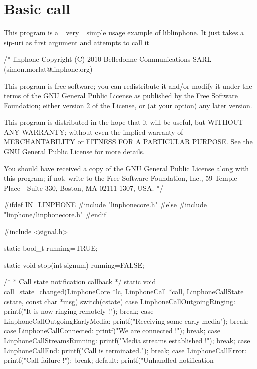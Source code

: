 \section{\-Basic call}
\label{group__basic__call__tutorials}
\-This program is a \-\_\-very\-\_\- simple usage example of liblinphone. \-It just takes a sip-\/uri as first argument and attempts to call it


\begin{DoxyCodeInclude}

/*
linphone
Copyright (C) 2010  Belledonne Communications SARL 
 (simon.morlat@linphone.org)

This program is free software; you can redistribute it and/or
modify it under the terms of the GNU General Public License
as published by the Free Software Foundation; either version 2
of the License, or (at your option) any later version.

This program is distributed in the hope that it will be useful,
but WITHOUT ANY WARRANTY; without even the implied warranty of
MERCHANTABILITY or FITNESS FOR A PARTICULAR PURPOSE.  See the
GNU General Public License for more details.

You should have received a copy of the GNU General Public License
along with this program; if not, write to the Free Software
Foundation, Inc., 59 Temple Place - Suite 330, Boston, MA  02111-1307, USA.
*/

#ifdef IN_LINPHONE
#include "linphonecore.h"
#else
#include "linphone/linphonecore.h"
#endif

#include <signal.h>

static bool_t running=TRUE;

static void stop(int signum){
        running=FALSE;
}

/*
 * Call state notification callback
 */
static void call_state_changed(LinphoneCore *lc, LinphoneCall *call, 
      LinphoneCallState cstate, const char *msg){
        switch(cstate){
                case LinphoneCallOutgoingRinging:
                        printf("It is now ringing remotely !\n");
                break;
                case LinphoneCallOutgoingEarlyMedia:
                        printf("Receiving some early media\n");
                break;
                case LinphoneCallConnected:
                        printf("We are connected !\n");
                break;
                case LinphoneCallStreamsRunning:
                        printf("Media streams established !\n");
                break;
                case LinphoneCallEnd:
                        printf("Call is terminated.\n");
                break;
                case LinphoneCallError:
                        printf("Call failure !");
                break;
                default:
                        printf("Unhandled notification %
        }
}


\end{DoxyCodeInclude}
